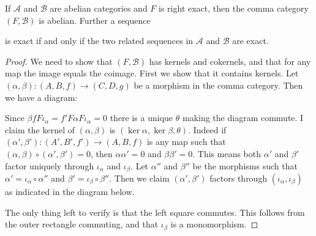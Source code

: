 \begin{prop}\label{prop:comma-cat_abelian}
	If $\mathcal A$ and $\mathcal B$ are abelian categories and $F$ is right exact, then the comma category $(F, \mathcal  B)$ is abelian. Further a sequence
	\begin{center}
	\end{center}
	is exact if and only if the two related sequences in $\mathcal A$ and $\mathcal B$ are exact.
	\begin{center}
	\end{center}
	\begin{proof}
		We need to show that $(F, \mathcal B)$ has kernels and cokernels, and that for any map the image equals the coimage. First we show that it contains kernels. Let $(\alpha, \beta)\colon(A, B, f) \to (C, D, g)$ be a morphism in the comma category. Then we have a diagram:
		\begin{center}
		\end{center}
		Since $\beta f F\iota_\alpha = f' F\alpha F \iota_\alpha = 0$ there is a unique $\theta$ making the diagram commute. I claim the kernel of $(\alpha, \beta)$ is $(\ker \alpha, \ker \beta, \theta)$. Indeed if $(\alpha', \beta')\colon (A', B', f') \to (A, B, f)$ is any map such that $(\alpha, \beta) \circ (\alpha', \beta') = 0$, then $\alpha\alpha'=0$ and $\beta\beta'=0$. This means both $\alpha'$ and $\beta'$ factor uniquely through $\iota_\alpha$ and $\iota_\beta$. Let $\alpha''$ and $\beta''$ be the morphisms such that $\alpha' = \iota_\alpha \circ \alpha''$ and $\beta' = \iota_\beta \circ \beta''$. Then we claim $(\alpha', \beta')$ factors through $(\iota_\alpha, \iota_\beta)$ as indicated in the diagram below.
		\begin{center}
		\end{center}
		The only thing left to verify is that the left square commutes. This follows from the outer rectangle commuting, and that $\iota_\beta$ is a monomorphism.
		

\end{proof}
\end{prop}

